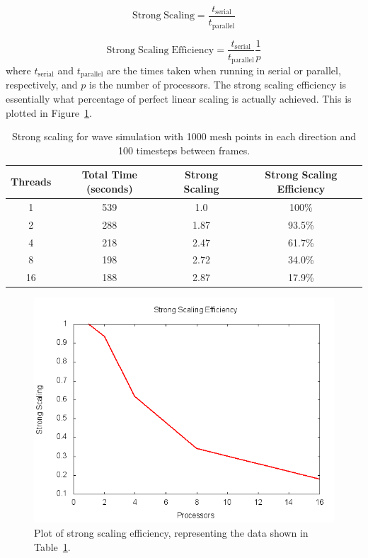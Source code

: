 \documentclass[12pt]{article}
\begin{document}
\begin{equation}
\mathrm{Strong \; Scaling} = \frac{t_{\mathrm{serial}}}{t_{\mathrm{parallel}}}
\label{strongscale}
\end{equation}

\begin{equation}
\mathrm{Strong \; Scaling \; Efficiency} = \frac{t_{\mathrm{serial}}}{t_{\mathrm{parallel}}} \frac{1}{p}
\label{normss}
\end{equation}
where $t_{\mathrm{serial}}$ and $t_{\mathrm{parallel}}$ are the times taken when running in serial or parallel, respectively, and $p$ is the number of processors. The strong scaling efficiency is essentially what percentage of perfect linear scaling is actually achieved. This is plotted in Figure~\ref{ssplot}.

\begin{table}[h]
	\begin{center}
		\begin{tabular}{|c c c c|}
			\hline
			Threads & Total Time (seconds) & Strong Scaling & Strong Scaling Efficiency \\ \hline
			1 & 539 & 1.0  & 100\% \\ \hline
			2 & 288 & 1.87 &  93.5\% \\ \hline
			4 & 218 &  2.47&  61.7\%  \\ \hline
			8 & 198 &  2.72&  34.0\%  \\ \hline
			16 & 188 &  2.87& 17.9\%   \\ \hline
		\end{tabular}
		\caption{Strong scaling for wave simulation with 1000 mesh points in each direction and 100 timesteps between frames.}
		\label{sstable}
	\end{center}
\end{table}

		\begin{figure}[h]
			\begin{center}
				\includegraphics[width=0.5\columnwidth]{ssplot}
				\caption{Plot of strong scaling efficiency, representing the data shown in Table~\ref{sstable}.}
				\label{ssplot}
			\end{center}
		\end{figure}
\end{document}

